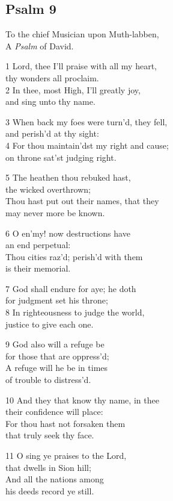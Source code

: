 \begin{multicols}{3}
\subsection*{Psalm 9 }


To the chief Musician upon Muth-labben,\\
A \emph{Psalm} of David.

1 Lord, thee I’ll praise with all my heart,\\
thy wonders all proclaim.\\
2 In thee, most High, I’ll greatly joy,\\
and sing unto thy name.

3 When back my foes were turn’d, they fell,\\
and perish’d at thy sight:\\
4 For thou maintain’dst my right and cause;\\
on throne sat’st judging right.

5 The heathen thou rebuked hast,\\
the wicked overthrown;\\
Thou hast put out their names, that they\\
may never more be known.

6 O en’my! now destructions have\\
an end perpetual:\\
Thou cities raz’d; perish’d with them\\
is their memorial.

7 God shall endure for aye; he doth\\
for judgment set his throne;\\
8 In righteousness to judge the world,\\
justice to give each one.

9 God also will a refuge be\\
for those that are oppress’d;\\
A refuge will he be in times\\
of trouble to distress’d.

10 And they that know thy name, in thee\\
their confidence will place:\\
For thou hast not forsaken them\\
that truly seek thy face.

11 O sing ye praises to the Lord,\\
that dwells in Sion hill;\\
And all the nations among\\
his deeds record ye still.


\end{multicols}
